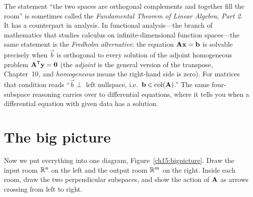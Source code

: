 \begin{connectionbox}
The statement ``the two spaces are orthogonal complements and together fill the room'' is
sometimes called the \emph{Fundamental Theorem of Linear Algebra, Part 2}. It has a counterpart in
analysis. In functional analysis---the branch of mathematics that studies calculus on
infinite-dimensional function spaces---the same statement is the \emph{Fredholm alternative}: the
equation $\mathbf{A}\mathbf{x}=\mathbf{b}$ is solvable precisely when $\vec{b}$ is orthogonal to every
solution of the adjoint homogeneous problem $\mathbf{A}^{\mathsf{T}}\mathbf{y}=\mathbf{0}$ (the \emph{adjoint} is the
general version of the transpose, Chapter~10, and \emph{homogeneous} means the right-hand side is
zero). For matrices that condition reads ``$\vec{b}\perp$ left nullspace, i.e.\
$\mathbf{b}\in\operatorname{col}(\mathbf{A})$.'' The same four-subspace reasoning carries over to differential
equations, where it tells you when a differential equation with given data has a solution.
\end{connectionbox}

\section{The big picture}

Now we put everything into one diagram, Figure~\ref{ch15:bigpicture}. Draw the input room $\mathbb{R}^n$ on
the left and the output room $\mathbb{R}^m$ on the right. Inside each room, draw the two perpendicular
subspaces, and show the action of $\mathbf{A}$ as arrows crossing from left to right.

